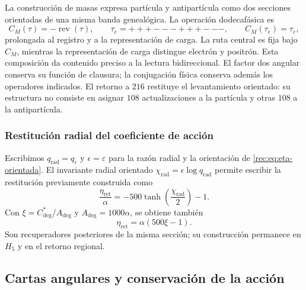 La construcción de masas expresa partícula y antipartícula como dos
secciones orientadas de una misma banda genealógica. La operación
dodecafásica es
\begin{equation}
 C_M(\tau)=-\operatorname{rev}(\tau),
 \qquad \tau_e=+++---+++---,
 \qquad C_M(\tau_e)=\tau_e,
 \label{md:compos:conjugacion-dodecafasica}
\end{equation}
prolongada al registro y a la representación de carga. La ruta central es
fija bajo $C_M$, mientras la representación de carga distingue electrón y
positrón. Esta composición da contenido preciso a la lectura bidireccional.
El factor dos angular conserva su función de clausura; la conjugación física
conserva además los operadores indicados. El retorno a $216$ restituye el
levantamiento orientado: su estructura no consiste en asignar $108$
actualizaciones a la partícula y otras $108$ a la antipartícula.

\subsubsection{Restitución radial del coeficiente de acción}
\label{md:compos:quinientos}

Escribimos $q_{\mathrm{rad}}=q_\varepsilon$ y $\epsilon=\varepsilon$ para
la razón radial y la orientación de \eqref{rec:eq:eta-orientada}.
El invariante radial orientado $\chi_{\mathrm{rad}}=\epsilon\log q_{\mathrm{rad}}$
permite escribir la restitución previamente construida como
\begin{equation}
 \frac{\eta_{\mathrm{ret}}}{\alpha}
 =-500\tanh\!\left(\frac{\chi_{\mathrm{rad}}}{2}\right)-1.
 \label{md:compos:restitucion-radial}
\end{equation}
Con $\xi=C^*_{\deg}/A_{\deg}$ y $A_{\deg}=1000\alpha$, se obtiene también
\begin{equation}
 \eta_{\mathrm{ret}}=\alpha(500\xi-1).
 \label{md:compos:restitucion-xi}
\end{equation}
Son recuperadores posteriores de la misma sección; su construcción permanece
en $H_5$ y en el retorno regional.

\subsection{Cartas angulares y conservación de la acción}
\label{md:compos:cartas}

